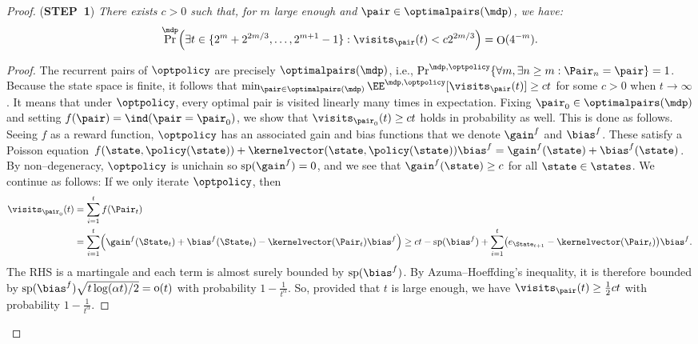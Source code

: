 \documentclass[preprint,cleveref,12pt]{colt2025}
\DeclarePairedDelimiter{\braces}{\{}{\}}	%
\DeclarePairedDelimiter{\parens}{(}{)}	%
\newcommand{\indic}[1]{\ind\parens{#1}}
\def\indicator{\indic}
\newcommand{\vecspan}[1]{\mathrm{sp}\parens{#1}}
\DeclareMathOperator*{\oh}{\mathrm{o}}
\DeclareMathOperator*{\OH}{\mathrm{O}}
\def\model{\mdp}
\def\kernel{\kernelvector}
\def\optpairs{\optimalpairs}
\def\STEP#1{(\strong{STEP~#1})}
\newcommand{\strong}[1]{\textbf{#1}}
\begin{document}
\begin{proof}
        \bigskip
        \par
        \noindent
        \STEP{1}
        \textit{
            There exists $c > 0$ such that, for $m$ large enough and $\pair \in \optpairs(\model)$, we have:
            \begin{equation*}
                \Pr^\model \parens*{
                    \exists t \in \braces{2^m + 2^{2m/3}, \ldots, 2^{m+1}-1}
                    :
                    \visits_\pair (t) < c 2^{2m/3}
                }
                = 
                \OH(4^{-m})
                .
            \end{equation*}
        }
        \begin{proof}
            The recurrent pairs of $\optpolicy$ are precisely $\optpairs(\model)$, i.e., $\Pr^{\model, \optpolicy}\braces{\forall m, \exists n \ge m: \Pair_n = \pair} = 1$. 
            Because the state space is finite, it follows that $\min_{\pair \in \optpairs(\model) }\EE^{\model, \optpolicy}[\visits_\pair(t)] \ge c t$ for some $c > 0$ when $t \to \infty$. 
            It means that under $\optpolicy$, every optimal pair is visited linearly many times in expectation. 
            Fixing $\pair_0 \in \optpairs(\model)$ and setting $f(\pair) = \indicator{\pair = \pair_0}$, we show that $\visits_{\pair_0}(t) \ge c t$ holds in probability as well.
            This is done as follows.
            Seeing $f$ as a reward function, $\optpolicy$ has an associated gain and bias functions that we denote $\gain^f$ and $\bias^f$. 
            These satisfy a Poisson equation $f(\state, \policy(\state)) + \kernel(\state, \policy(\state)) \bias^f = \gain^f(\state) + \bias^f(\state)$.
            By non--degeneracy, $\optpolicy$ is unichain so $\vecspan{\gain^f} = 0$, and we see that $\gain^f(\state) \ge c$ for all $\state \in \states$. 
            We continue as follows: If we only iterate $\optpolicy$, then
            \begin{align*}
                \visits_{\pair_0} (t)
                & = \sum_{i=1}^t f(\Pair_t)
                \\
                & =
                \sum_{i=1}^t 
                \parens*{
                    \gain^f(\State_t) + \bias^f(\State_t) - \kernel(\Pair_t) \bias^f
                }
                \ge
                c t - \vecspan{\bias^f}
                + \sum_{i=1}^t \parens*{e_{\State_{t+1}} - \kernel(\Pair_t)} \bias^f
                .
            \end{align*}
            The RHS is a martingale and each term is almost surely bounded by $\vecspan{\bias^f}$. 
            By Azuma--Hoeffding's inequality, it is therefore bounded by $\vecspan{\bias^f}\sqrt{t \log(\alpha t)/2} = \oh(t)$ with probability $1 - \frac 1{t^\alpha}$.
            So, provided that $t$ is large enough, we have $\visits_\pair (t) \ge \frac 12 ct$ with probability $1 - \frac 1{t^\alpha}$.


\end{proof}
\end{proof}
\end{document}
